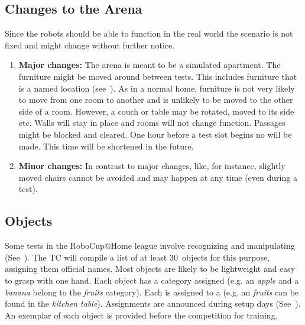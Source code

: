 \subsection{Changes to the Arena}
\label{rule:scenario_changes}

Since the robots should be able to function in the real world the scenario is not fixed and might change without further notice.
\begin{enumerate}
	\item \textbf{Major changes:}
	The arena is meant to be a simulated apartment.
	The furniture might be moved around between tests.
	This includes furniture that is a named location (see~).
	As in a normal home, furniture is not very likely to move from one room to another and is unlikely to be moved to the other side of a room.
	However, a couch or table may be rotated, moved to its side etc.
	Walls will stay in place and rooms will not change function.
	Passages might be blocked and cleared.
	One hour before a test slot begins no  will be made.
	This time will be shortened in the future.

	\item \textbf{Minor changes:} In contrast to major changes,  like, for instance, slightly moved chairs cannot be avoided and may happen at any time (even during a test).
\end{enumerate}


%
%
%
\def\NumObjects{30\ }
\def\NumLocations{20\ }
\def\NumNames{20\ }

\subsection{Objects}
\label{rule:scenario_objects}
Some tests in the RoboCup@Home league involve recognizing and manipulating (See~).
The TC will compile a list of at least \NumObjects objects for this purpose, assigning them official names.
Most objects are likely to be lightweight and easy to grasp with one hand.
Each object has a category assigned (e.g. an \textit{apple} and a \textit{banana} belong to the \textit{fruits} category).
Each  is assigned to a  (e.g. an \textit{fruits} can be found in the \textit{kitchen table}).
Assignments are announced during setup days (See~).
An exemplar of each object is provided before the competition for training.

